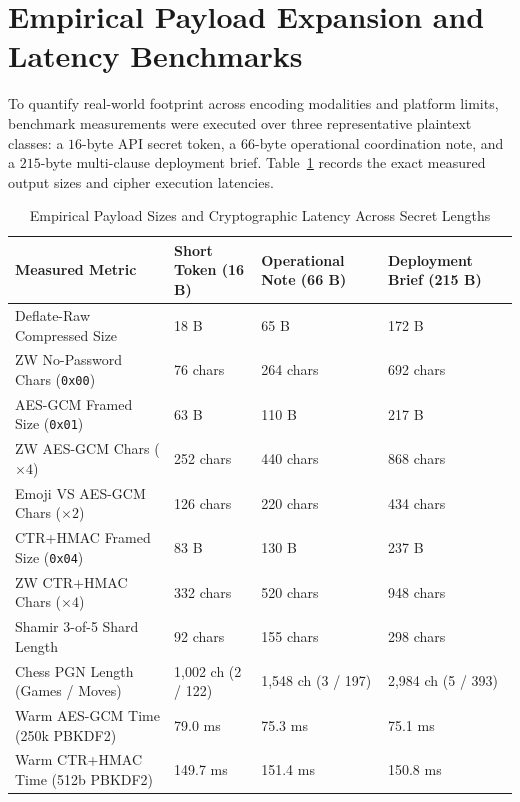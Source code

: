 \documentclass[12pt,a4paper,oneside,openany]{report}
\begin{document}
\section{Empirical Payload Expansion and Latency Benchmarks}
To quantify real-world footprint across encoding modalities and platform limits, benchmark measurements were executed over three representative plaintext classes: a $16$-byte API secret token, a $66$-byte operational coordination note, and a $215$-byte multi-clause deployment brief. Table~\ref{tab:results_performance} records the exact measured output sizes and cipher execution latencies.

\begin{table}[H]
\centering
\small
\caption{Empirical Payload Sizes and Cryptographic Latency Across Secret Lengths}
\label{tab:results_performance}
\begin{tabularx}{\textwidth}{lXXX}
\toprule
\textbf{Measured Metric} & \textbf{Short Token (16 B)} & \textbf{Operational Note (66 B)} & \textbf{Deployment Brief (215 B)} \\
\midrule
Deflate-Raw Compressed Size & 18 B & 65 B & 172 B \\
ZW No-Password Chars (\texttt{0x00}) & 76 chars & 264 chars & 692 chars \\
AES-GCM Framed Size (\texttt{0x01}) & 63 B & 110 B & 217 B \\
ZW AES-GCM Chars ($\times 4$) & 252 chars & 440 chars & 868 chars \\
Emoji VS AES-GCM Chars ($\times 2$) & 126 chars & 220 chars & 434 chars \\
CTR+HMAC Framed Size (\texttt{0x04}) & 83 B & 130 B & 237 B \\
ZW CTR+HMAC Chars ($\times 4$) & 332 chars & 520 chars & 948 chars \\
Shamir 3-of-5 Shard Length & 92 chars & 155 chars & 298 chars \\
Chess PGN Length (Games / Moves) & 1,002 ch (2 / 122) & 1,548 ch (3 / 197) & 2,984 ch (5 / 393) \\
Warm AES-GCM Time (250k PBKDF2) & 79.0 ms & 75.3 ms & 75.1 ms \\
Warm CTR+HMAC Time (512b PBKDF2) & 149.7 ms & 151.4 ms & 150.8 ms \\
\bottomrule
\end{tabularx}
\end{table}
\end{document}
